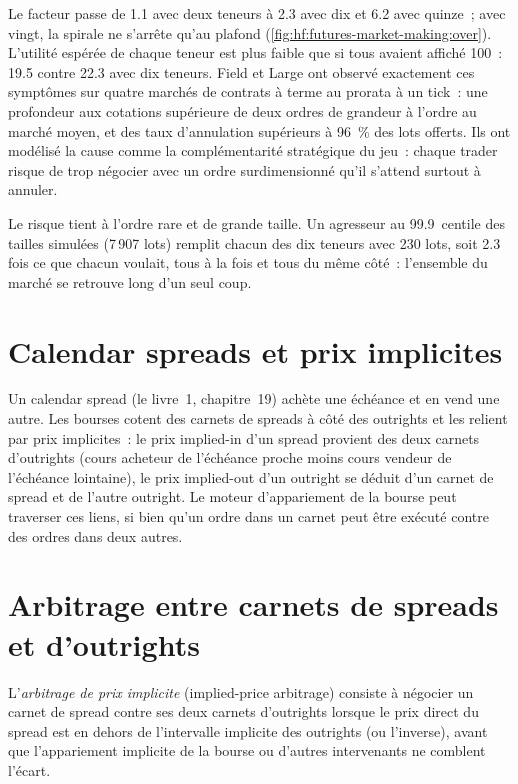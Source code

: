 Le facteur passe de 1.1 avec deux teneurs à 2.3 avec dix et 6.2 avec quinze~; avec vingt, la spirale ne s'arrête qu'au plafond
(\cref{fig:hf:futures-market-making:over}). L'utilité espérée de chaque teneur est plus faible que si tous avaient affiché 100~: 19.5 contre 22.3 avec dix teneurs.
Field et Large ont observé exactement ces symptômes sur quatre marchés de contrats à terme au prorata à un tick~: une profondeur aux cotations supérieure de deux
ordres de grandeur à l'ordre au marché moyen, et des taux d'annulation supérieurs à 96~\% des lots offerts. Ils ont modélisé la cause comme la complémentarité stratégique du jeu~: chaque
trader risque de trop négocier avec un ordre surdimensionné qu'il s'attend surtout à annuler.

Le risque tient à l'ordre rare et de grande taille. Un agresseur au 99.9~centile des tailles simulées (7\,907 lots) remplit chacun des dix teneurs avec 230 lots,
soit 2.3 fois ce que chacun voulait, tous à la fois et tous du même côté~: l'ensemble du marché se retrouve long d'un seul coup.

\section{Calendar spreads et prix implicites}

Un calendar spread (le livre~1, chapitre~19) achète une échéance et en vend une autre. Les bourses cotent des carnets de spreads à côté des outrights et les relient par
prix implicites~: le prix implied-in d'un spread provient des deux carnets d'outrights (cours acheteur de l'échéance proche moins cours vendeur de l'échéance lointaine), le prix implied-out
d'un outright se déduit d'un carnet de spread et de l'autre outright. Le moteur d'appariement de la bourse peut traverser ces liens, si bien qu'un ordre dans un carnet peut être
exécuté contre des ordres dans deux autres.

\section{Arbitrage entre carnets de spreads et d'outrights}

\begin{definition}\label{def:hf:futures-market-making:implied}
L'\emph{arbitrage de prix implicite} (implied-price arbitrage) consiste à négocier un carnet de spread contre ses deux carnets d'outrights lorsque le prix direct du spread
est en dehors de l'intervalle implicite des outrights (ou l'inverse), avant que l'appariement implicite de la bourse ou d'autres intervenants ne comblent l'écart.
\end{definition}

